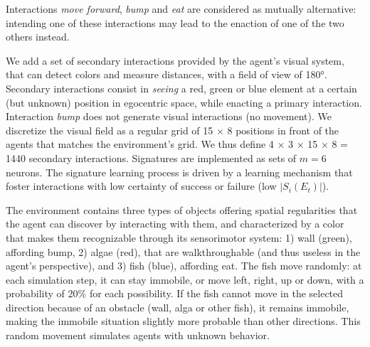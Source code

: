 \documentclass[conference]{IEEEtran}
\begin{document}
Interactions \textit{move forward}, \textit{bump} and \textit{eat} are considered as mutually alternative: intending one of these interactions may lead to the enaction of one of the two others instead. %

We add a set of secondary interactions provided by the agent’s visual system, that can detect colors %
and measure distances, with a field of view of 180°.
Secondary interactions consist in \textit{seeing} a red, green or blue element at a certain (but unknown) position in egocentric space, while enacting a primary interaction.
Interaction \textit{bump} %
does not generate visual interactions (no movement).
We discretize the visual field as a regular grid of 15 × 8 positions in front of the agents that matches the environment's grid.
We thus define 4 × 3 × 15 × 8 = 1440 secondary interactions.
Signatures are implemented as sets of $m=6$ neurons. %
The signature learning process is driven by a learning mechanism that foster interactions with low certainty of success or failure (low $|S_i(E_t)|$).

The environment contains three types of objects offering spatial regularities that the agent can discover by interacting with them, and characterized by a color that makes them recognizable through its sensorimotor system: 1) wall (green), affording bump, 2) algae (red), that are walkthroughable (and thus useless in the agent's perspective), and 3) fish (blue), affording eat. %
The fish move randomly: at each simulation step, it can stay immobile, or move left, right, up or down, with a probability of 20\% for each possibility. %
If the fish cannot move in the selected direction because of an obstacle (wall, alga or other fish), it remains immobile, making the immobile situation slightly more probable than other directions. This random movement simulates agents with unknown behavior.
\end{document}
